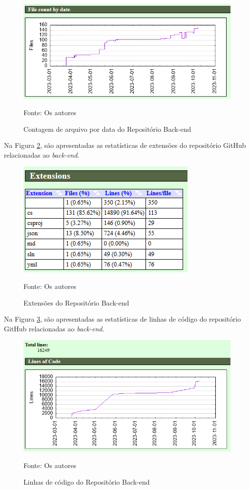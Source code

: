\begin{apendicesenv}
\begin{figure}[H]
	\centering
	\includegraphics[scale=0.8]{./imagens/metricas/gitStatsBackend/files/fileCount.png}
	\caption{Contagem de arquivo por data do Repositório Back-end}
	Fonte: Os autores
    \label{fileCountBackend}
\end{figure}

Na Figura \ref{extensionsBackend}, são apresentadas as estatísticas de extensões do repositório GitHub relacionadas ao \textit{back-end}.

\begin{figure}[H]
	\centering
	\includegraphics[scale=1]{./imagens/metricas/gitStatsBackend/files/extensions.png}
	\caption{Extensões do Repositório Back-end}
	Fonte: Os autores
    \label{extensionsBackend}
\end{figure}
\pagebreak

Na Figura \ref{linesBackend}, são apresentadas as estatísticas de linhas de código do repositório GitHub relacionadas ao \textit{back-end}.

\begin{figure}[H]
	\centering
	\includegraphics[scale=0.8]{./imagens/metricas/gitStatsBackend/lines/linesOfCode.png}
	\caption{Linhas de código do Repositório Back-end}
	Fonte: Os autores
    \label{linesBackend}
\end{figure}


\end{apendicesenv}
